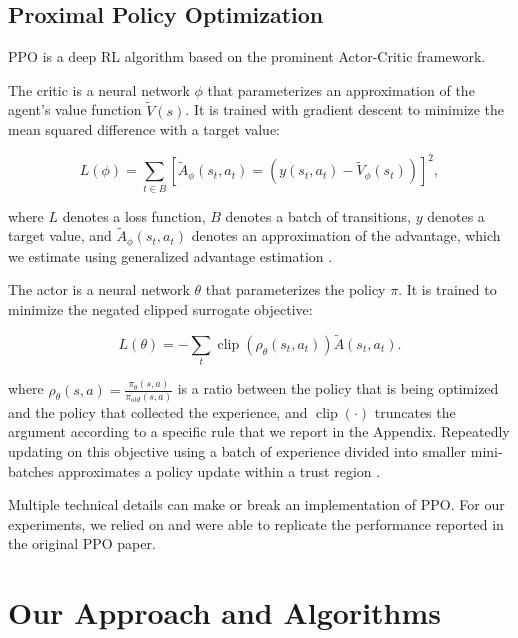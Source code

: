 \documentclass[letterpaper]{article} %
\DeclareMathOperator*{\clip}{clip}
\begin{document}
\subsection{Proximal Policy Optimization}
\label{sec:problem_proximal}

PPO \cite{schulman2017proximal} is a deep RL algorithm based on the prominent Actor-Critic framework. 

The critic is a neural network $\phi$ that parameterizes an approximation of the agent's value function $\tilde{V}(s)$. It is trained with gradient descent to minimize the mean squared difference with a target value:

\begin{equation}\label{eq:loss_ppo_critic}
    L(\phi) = \sum_{t \in B} \left[\tilde{A}_\phi(s_t, a_t) = (y(s_t, a_t) - \tilde{V}_\phi(s_t)) \right]^2,
\end{equation}

\noindent where $L$ denotes a loss function, $B$ denotes a batch of transitions, $y$ denotes a target value, and $\tilde{A}_\phi(s_t, a_t)$ denotes an approximation of the advantage, which we estimate using generalized advantage estimation \cite{schulman2015high}. 

The actor is a neural network $\theta$ that parameterizes the policy $\pi$. It is trained to minimize the negated clipped surrogate objective:

\begin{equation}\label{eq:loss_ppo_actor_short}
    L(\theta) = - \sum_t \clip(\rho_\theta(s_t, a_t)) \tilde{A}(s_t, a_t).
\end{equation}

\noindent where $\rho_\theta(s, a) = \frac{\pi_\theta(s, a)}{\pi_{old}(s, a)}$ is a ratio between the policy that is being optimized and the policy that collected the experience, and $\clip(\cdot)$ truncates the argument according to a specific rule that we report in the Appendix. Repeatedly updating on this objective using a batch of experience divided into smaller mini-batches approximates a policy update within a trust region \cite{schulman2015trust}.


Multiple technical details can make or break an implementation of PPO. For our experiments, we relied on \cite{shengyi2022the37implementation} and were able to replicate the performance reported in the original PPO paper. 



\section{Our Approach and Algorithms}
\label{sec:our}
\end{document}
